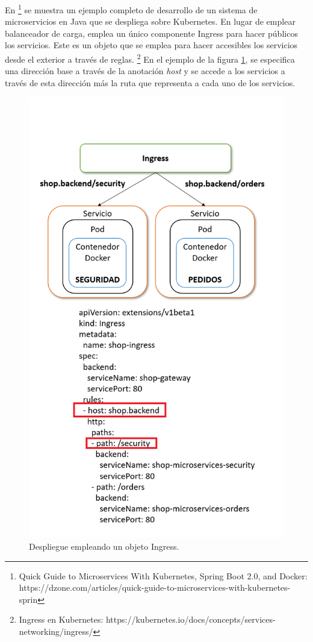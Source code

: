 \documentclass[11pt,spanish,listoffigures]{tfgetsinf}
\begin{document}
En \footnote{Quick Guide to Microservices With Kubernetes, Spring Boot 2.0, and Docker: https://dzone.com/articles/quick-guide-to-microservices-with-kubernetes-sprin} se muestra un ejemplo completo de desarrollo de un sistema de microservicios en Java que se despliega sobre Kubernetes. En lugar de emplear balanceador de carga, emplea un único componente Ingress para hacer públicos los servicios. Este es un objeto que se emplea para hacer accesibles los servicios desde el exterior a través de reglas. \footnote{Ingress en Kubernetes: https://kubernetes.io/docs/concepts/services-networking/ingress/} En el ejemplo de la figura \ref{fig:Ingress}, se especifica una dirección base a través de la anotación \textit{host} y se accede a los servicios a través de esta dirección más la ruta que representa a cada uno de los servicios.

\begin{figure}[h]
\centering
\includegraphics[scale=0.7]{Ingress}
\caption{Despliegue empleando un objeto Ingress.}
\label{fig:Ingress}
\end{figure}
\end{document}

